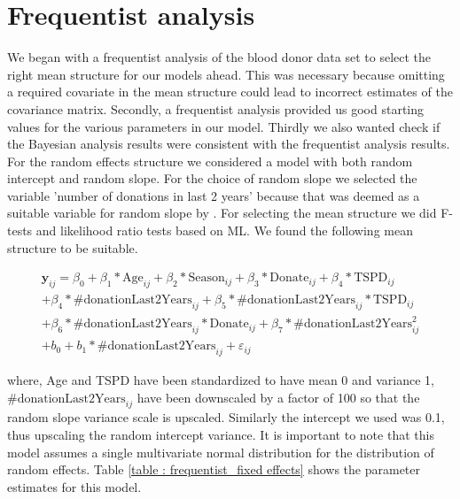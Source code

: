 \section{Frequentist analysis}
\label{sec : frequentist_blood_donor}
We began with a frequentist analysis of the blood donor data set to select the right mean structure for our models ahead. This was necessary because omitting a required covariate in the mean structure could lead to incorrect estimates of the covariance matrix. Secondly, a frequentist analysis provided us good starting values for the various parameters in our model. Thirdly we also wanted check if the Bayesian analysis results were consistent with the frequentist analysis results. For the random effects structure we considered a model with both random intercept and random slope. For the choice of random slope we selected the variable 'number of donations in last 2 years' because that was deemed as a suitable variable for random slope by \citet{nasserinejad_prevalence_2015}. For selecting the mean structure we did F-tests and likelihood ratio tests based on ML. We found the following mean structure to be suitable.

\begin{equation}
\label{eq : blood_donor_model}
\begin{split}
\boldsymbol{y}_{ij} = \beta_0 + \beta_1*\text{Age}_{ij} + \beta_2*\text{Season}_{ij} + \beta_3*\text{Donate}_{ij} + \beta_4*\text{TSPD}_{ij}\\
+ \beta_4*\text{\#donationLast2Years}_{ij} + \beta_5*\text{\#donationLast2Years}_{ij}*\text{TSPD}_{ij}\\
+ \beta_6*\text{\#donationLast2Years}_{ij}*\text{Donate}_{ij} + \beta_7*\text{\#donationLast2Years}_{ij}^2\\
+ b_0 + b_1 * \text{\#donationLast2Years}_{ij} + \varepsilon_{ij}
\end{split}
\end{equation}

where, Age and TSPD have been standardized to have mean 0 and variance 1, $\text{\#donationLast2Years}_{ij}$ have been downscaled by a factor of 100 so that the random slope variance scale is upscaled. Similarly the intercept we used was 0.1, thus upscaling the random intercept variance. It is important to note that this model assumes a single multivariate normal distribution for the distribution of random effects. Table \ref{table : frequentist_fixed effects} shows the parameter estimates for this model. 

